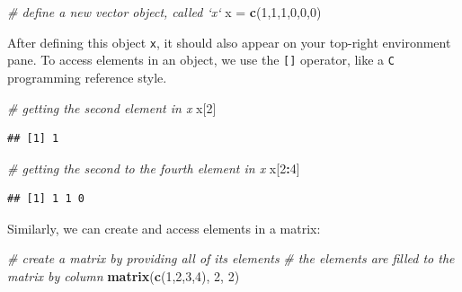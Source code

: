 \documentclass[
]{book}
\newenvironment{Shaded}{\begin{snugshade}}{\end{snugshade}}
\newcommand{\CommentTok}[1]{\textcolor[rgb]{0.56,0.35,0.01}{\textit{#1}}}
\newcommand{\DecValTok}[1]{\textcolor[rgb]{0.00,0.00,0.81}{#1}}
\newcommand{\KeywordTok}[1]{\textcolor[rgb]{0.13,0.29,0.53}{\textbf{#1}}}
\newcommand{\NormalTok}[1]{#1}
\newcommand{\OperatorTok}[1]{\textcolor[rgb]{0.81,0.36,0.00}{\textbf{#1}}}
\newcommand{\StringTok}[1]{\textcolor[rgb]{0.31,0.60,0.02}{#1}}
\begin{document}
\begin{Shaded}
\begin{Highlighting}[]
  \CommentTok{# define a new vector object, called `x`}
\NormalTok{  x =}\StringTok{ }\KeywordTok{c}\NormalTok{(}\DecValTok{1}\NormalTok{,}\DecValTok{1}\NormalTok{,}\DecValTok{1}\NormalTok{,}\DecValTok{0}\NormalTok{,}\DecValTok{0}\NormalTok{,}\DecValTok{0}\NormalTok{)}
\end{Highlighting}
\end{Shaded}

After defining this object \texttt{x}, it should also appear on your top-right environment pane. To access elements in an object, we use the \texttt{{[}{]}} operator, like a \texttt{C} programming reference style.

\begin{Shaded}
\begin{Highlighting}[]
  \CommentTok{# getting the second element in x}
\NormalTok{  x[}\DecValTok{2}\NormalTok{]}
\end{Highlighting}
\end{Shaded}

\begin{verbatim}
## [1] 1
\end{verbatim}

\begin{Shaded}
\begin{Highlighting}[]
  \CommentTok{# getting the second to the fourth element in x}
\NormalTok{  x[}\DecValTok{2}\OperatorTok{:}\DecValTok{4}\NormalTok{]}
\end{Highlighting}
\end{Shaded}

\begin{verbatim}
## [1] 1 1 0
\end{verbatim}

Similarly, we can create and access elements in a matrix:

\begin{Shaded}
\begin{Highlighting}[]
  \CommentTok{# create a matrix by providing all of its elements}
  \CommentTok{# the elements are filled to the matrix by column}
  \KeywordTok{matrix}\NormalTok{(}\KeywordTok{c}\NormalTok{(}\DecValTok{1}\NormalTok{,}\DecValTok{2}\NormalTok{,}\DecValTok{3}\NormalTok{,}\DecValTok{4}\NormalTok{), }\DecValTok{2}\NormalTok{, }\DecValTok{2}\NormalTok{)}
\end{Highlighting}
\end{Shaded}
\end{document}
